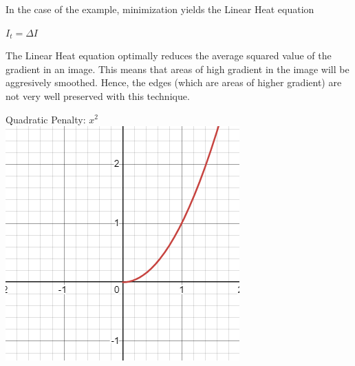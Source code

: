 \documentclass{article}
\begin{document}
  \newpage
  \noindent
  In the case of the example, minimization yields the Linear Heat equation
  \begin{center}
    $I_{t} = \Delta I$
  \end{center}
  The Linear Heat equation optimally reduces the average squared value of the gradient in an image.
  This means that areas of high gradient in the image will be aggresively smoothed. Hence, the edges (which
  are areas of higher gradient) are not very well preserved with this technique.
  \begin{center}
    Quadratic Penalty: $x^2$\\
    \vspace{12pt}
    \includegraphics[scale=0.5]{../report_images/squared.png}
  \end{center}
  \vspace{12pt}
\end{document}
